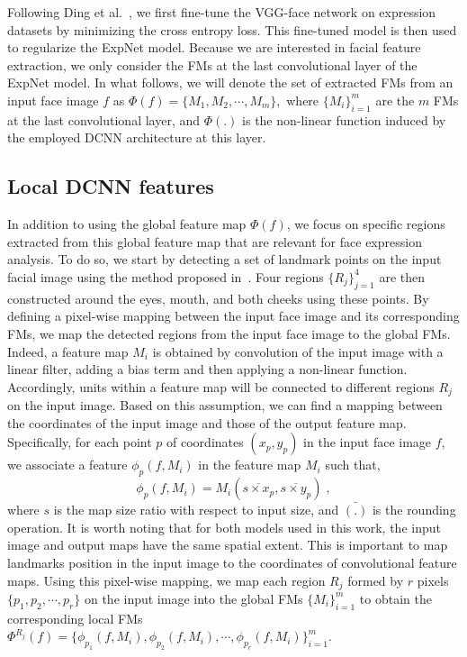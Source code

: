 \documentclass{bmvc2k}
\begin{document}
Following Ding et al.~\cite{ding2017facenet2expnet}, we first fine-tune the VGG-face network on expression datasets by minimizing the cross entropy loss. This fine-tuned model is then used to regularize the ExpNet model. Because we are interested in facial feature extraction, we only consider the FMs at the last convolutional layer of the ExpNet model. In what follows, we will denote the set of extracted FMs from an input face image $f$ as $\Phi(f)=\{M_1, M_2, \cdots, M_{m}\}$,~where $\{M_i\}_{i=1}^{m}$ are the $m$ FMs at the last convolutional layer, and $\Phi(.)$ is the non-linear function induced by the employed DCNN architecture at this layer. 

\subsection{Local DCNN features}
In addition to using the global feature map $\Phi(f)$, we focus on specific regions extracted from this global feature map that are relevant for face expression analysis. 
To do so, we start by detecting a set of landmark points on the input facial image using the method proposed in~\cite{asthana2014incremental}. Four regions $\{R_{j}\}_{j=1}^4$ are then constructed around the eyes, mouth, and both cheeks using these points. By defining a pixel-wise mapping between the input face image and its corresponding FMs, we map the detected regions from the input face image to the global FMs. Indeed, a feature map $M_{i}$ is obtained by convolution of the input image with a linear filter, adding a bias term and then applying a non-linear function. Accordingly, units within a feature map will be connected to different regions $R_{j}$ on the input image. Based on this assumption, we can find a mapping between the coordinates of the input image and those of the output feature map. 
Specifically, for each point $p$ of coordinates $(x_{p}, y_{p})$ in the input face image $f$, we associate a feature $\phi_{p}(f, M_{i})$ in the feature map $M_{i}$ such that,
\begin{equation}
\label{eq:Mapping}
\phi_{p}(f, M_{i}) = M{_i}(\overline{s \times x_{p}}, \overline{s\times y_{p}}) \; ,
\end{equation}
\noindent
where $s$ is the map size ratio with respect to input size, and $\bar{(.)}$ is the rounding operation. It is worth noting that for both models used in this work, the input image and output maps have the same spatial extent. This is important to map landmarks position in the input image to the coordinates of convolutional feature maps. Using this pixel-wise mapping, we map each region $R_j$ formed by $r$ pixels $\{p_1,p_2,\cdots,p_r\}$ on the input image into the global FMs $\{M_i\}_{i=1}^{m}$ to obtain the corresponding local FMs $\Phi^{R_j}(f)= \{\phi_{p_1}(f, M_{i}),\phi_{p_2}(f, M_{i}),\cdots,\phi_{p_r}(f, M_{i})\}_{i=1}^{m}$. 
\end{document}
